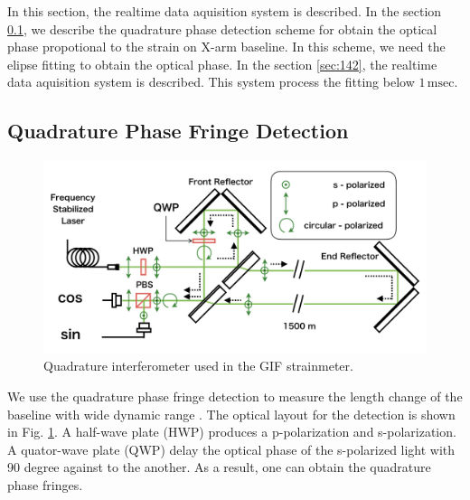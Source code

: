 In this section, the realtime data aquisition system is described.
In the section \cref{sec:141}, we describe the quadrature phase detection scheme for obtain the optical phase propotional to the strain on X-arm baseline. In this scheme, we need the elipse fitting to obtain the optical phase. In the section \cref{sec:142}, the realtime data aquisition system is described. This system process the fitting below $1\,\mathrm{msec}$.

\subsection{Quadrature Phase Fringe Detection} \label{sec:141}
\begin{figure}[h]
  \begin{center}
    \includegraphics[width=13.0cm]{./img_chap4/img413.png}
    \caption{Quadrature interferometer used in the GIF strainmeter.}\label{img:img413}
  \end{center}
\end{figure}
We use the quadrature phase fringe detection to measure the length change of the baseline with wide dynamic range \cite{bobroff1993recent}. The optical layout for the detection is shown in Fig. \ref{img:img413}. A half-wave plate (HWP) produces a p-polarization and s-polarization. A quator-wave plate (QWP) delay the optical phase of the s-polarized light with 90 degree against to the another. As a result, one can obtain the quadrature phase fringes.

